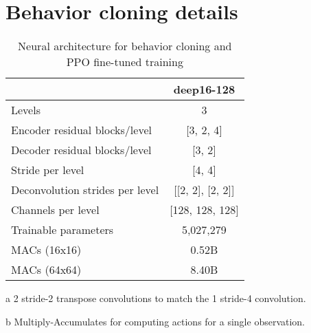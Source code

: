 \documentclass[conference,onecolumn]{IEEEtran}
\newcounter{supptable}
\newenvironment{supptable}
  {\renewcommand{\tablename}{Supplemental Table}\setcounter{table}{\value{supptable}}\addtocounter{supptable}{1}\begin{table}}
  {\end{table}\setcounter{supptable}{\value{table}}}
\begin{document}
\section{Behavior cloning details}
\label{appendix:behavior-cloning-details}
\begin{supptable}[H]
    \centering
    \begin{threeparttable}
    \caption{Neural architecture for behavior cloning and PPO fine-tuned training}
    \label{tab:bc-architecture}
    \begin{tabular}{lc}
    \toprule
                                 & deep16-128 \\
    \midrule
    Levels                      & 3  \\
    Encoder residual blocks/level & [3, 2, 4] \\
    Decoder residual blocks/level & [3, 2] \\
    Stride per level            & [4, 4] \\
    Deconvolution strides per level & [[2, 2], [2, 2]]\tnote{a}\\
    Channels per level          & [128, 128, 128] \\
    Trainable parameters        & 5,027,279 \\
    MACs\tnote{b} (16x16)          & 0.52B \\
    MACs\tnote{b} (64x64)          & 8.40B \\
    \bottomrule
    \end{tabular}
    \begin{tablenotes}
       \item[a] 2 stride-2 transpose convolutions to match the 1 stride-4 convolution.
       \item[b] Multiply-Accumulates for computing actions for a single observation.
    \end{tablenotes}
    \end{threeparttable}
\end{supptable}
\end{document}
